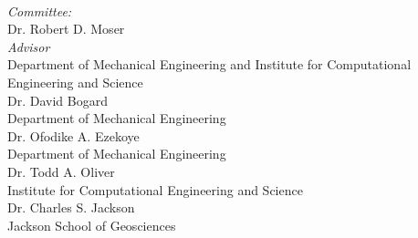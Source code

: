 \begin{titlepage}
\begin{minipage}{0.5\textwidth}
\begin{flushleft} \large
{}%
\end{flushleft}
\end{minipage}
~
\begin{minipage}{0.45\textwidth}
\begin{flushright} \large
\emph{Committee:} \\
 \vspace{5mm}
{\Large Dr. Robert D. Moser} \\
{\normalsize \textsl{Advisor}} \\
{\normalsize Department of Mechanical Engineering and Institute for Computational Engineering and Science} \\
 \vspace{5mm}
{\Large Dr. David Bogard} \\
{\normalsize Department of Mechanical Engineering} \\
 \vspace{5mm}
{\Large Dr. Ofodike A. Ezekoye} \\
{\normalsize Department of Mechanical Engineering} \\
 \vspace{5mm}
{\Large Dr. Todd A. Oliver} \\
{\normalsize Institute for Computational Engineering and Science} \\
 \vspace{5mm}
{\Large Dr. Charles S. Jackson} \\
{\normalsize Jackson School of Geosciences} \\
\end{flushright}
\end{minipage}\\[4cm]




 

\vfill %

\end{titlepage}
%
